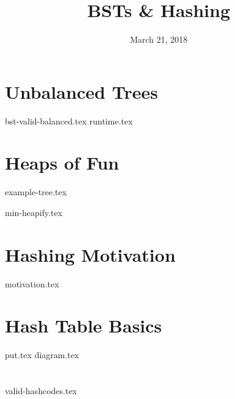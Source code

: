 \documentclass[11pt]{exam}
\title{BSTs \& Hashing}
\date{March 21, 2018}
\begin{document}
\maketitle

\section{Unbalanced Trees}
\begin{questions}
{bst-valid-balanced.tex}
{runtime.tex}
\end{questions}

\newpage
\section{Heaps of Fun}
{example-tree.tex}
\begin{questions}
{min-heapify.tex}
\end{questions}

\section{Hashing Motivation}
\begin{questions}
{motivation.tex}
\end{questions}

\section{Hash Table Basics}
\begin{questions}
{put.tex}
{diagram.tex}
\end{questions}

\section{}
\begin{questions}
{valid-hashcodes.tex}
\end{questions}
\end{document}
